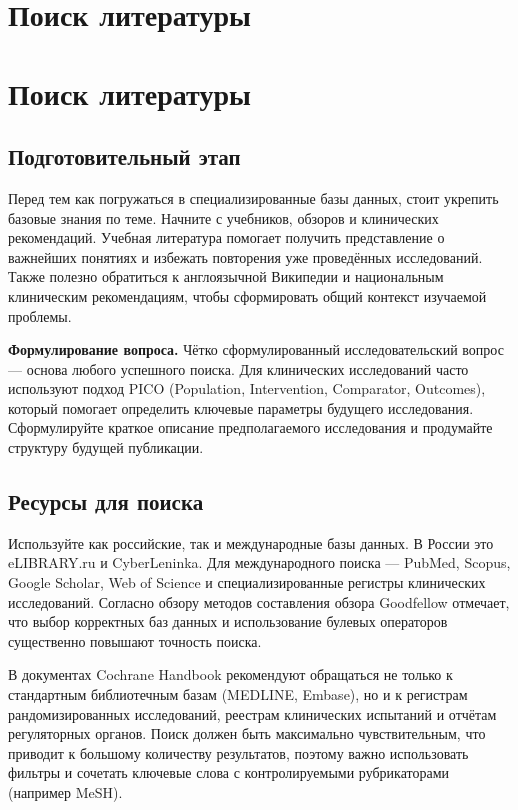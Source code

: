 \documentclass[
  russian,
  letterpaper,
]{book}
\begin{document}
\chapter{Поиск
литературы}\label{ux43fux43eux438ux441ux43a-ux43bux438ux442ux435ux440ux430ux442ux443ux440ux44b}

\chapter{Поиск литературы}\label{sec-literature_search}

\section{Подготовительный
этап}\label{ux43fux43eux434ux433ux43eux442ux43eux432ux438ux442ux435ux43bux44cux43dux44bux439-ux44dux442ux430ux43f}

Перед тем как погружаться в специализированные базы данных, стоит
укрепить базовые знания по теме. Начните с учебников, обзоров и
клинических рекомендаций. Учебная литература помогает получить
представление о важнейших понятиях и избежать повторения уже проведённых
исследований. Также полезно обратиться к англоязычной Википедии и
национальным клиническим рекомендациям, чтобы сформировать общий
контекст изучаемой проблемы.

\textbf{Формулирование вопроса.} Чётко сформулированный
исследовательский вопрос --- основа любого успешного поиска. Для
клинических исследований часто используют подход PICO (Population,
Intervention, Comparator, Outcomes), который помогает определить
ключевые параметры будущего исследования. Сформулируйте краткое описание
предполагаемого исследования и продумайте структуру будущей публикации.

\section{Ресурсы для
поиска}\label{ux440ux435ux441ux443ux440ux441ux44b-ux434ux43bux44f-ux43fux43eux438ux441ux43aux430}

Используйте как российские, так и международные базы данных. В России
это eLIBRARY.ru и CyberLeninka. Для международного поиска --- PubMed,
Scopus, Google Scholar, Web of Science и специализированные регистры
клинических исследований. Согласно обзору методов составления обзора
Goodfellow отмечает, что выбор корректных баз данных и использование
булевых операторов существенно повышают точность поиска.

В документах Cochrane Handbook рекомендуют обращаться не только к
стандартным библиотечным базам (MEDLINE, Embase), но и к регистрам
рандомизированных исследований, реестрам клинических испытаний и отчётам
регуляторных органов. Поиск должен быть максимально чувствительным, что
приводит к большому количеству результатов, поэтому важно использовать
фильтры и сочетать ключевые слова с контролируемыми рубрикаторами
(например MeSH).
\end{document}
